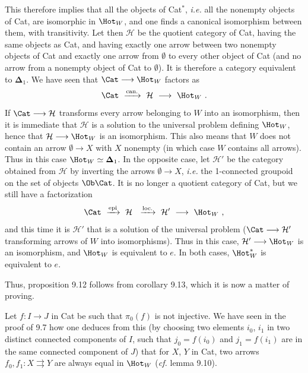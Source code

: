 This therefore implies that all the objects of Cat$^*$, \textit{i.e.} all the nonempty objects of Cat, are isomorphic in $\Hot_W$, and one finds a canonical isomorphism between them, with transitivity. Let then $\mathcal{H}$ be the quotient category of Cat, having the same objects as Cat, and having exactly one arrow between two nonempty objects of Cat and exactly one arrow from $\emptyset$ to every other object of Cat (and no arrow from a nonempty object of Cat to $\emptyset$). It is therefore a category equivalent to $\boldsymbol{\Delta}_1$. We have seen that $\Cat\longrightarrow\Hot_W$ factors as
\[
\Cat\ \xrightarrow{\text{can.}}\ \mathcal{H}\ \longrightarrow\ \Hot_W\ .
\]
If $\Cat\longrightarrow\mathcal{H}$ transforms every arrow belonging to $W$ into an isomorphism, then it is immediate that $\mathcal{H}$ is a solution to the universal problem defining $\Hot_W$, hence that $\mathcal{H}\longrightarrow\Hot_W$ is an isomorphism. This also means that $W$ does not contain an arrow $\emptyset\longrightarrow X$ with $X$ nonempty (in which case $W$ contains all arrows). Thus in this case $\Hot_W\simeq\boldsymbol{\Delta}_1$. In the opposite case, let $\mathcal{H}'$ be the category obtained from $\mathcal{H}$ by inverting the arrows $\emptyset\longrightarrow X$, \textit{i.e.} the 1-connected groupoid on the set of objects $\Ob\Cat$. It is no longer a quotient category of Cat, but we still have a factorization
\[
\Cat\ \xrightarrow{\text{epi}}\ \mathcal{H}\ \ \xrightarrow{\text{loc.}}\ \mathcal{H}'\ \longrightarrow\ \Hot_W\ ,
\]
and this time it is $\mathcal{H}'$ that is a solution of the universal problem ($\Cat\longrightarrow\mathcal{H}'$ transforming arrows of $W$ into isomorphisms). Thus in this case, $\mathcal{H}'\longrightarrow\Hot_W$ is an isomorphism, and $\Hot_W$ is equivalent to $e$. In both cases, $\Hot_W^*$ is equivalent to $e$.

Thus, proposition 9.12 follows from corollary 9.13, which it is now a matter of proving.

Let $f:I\longrightarrow J$ in Cat be such that $\pi_0(f)$ is not injective. We have seen in the proof of 9.7 how one deduces from this (by choosing two elements $i_0$, $i_1$ in two distinct connected components of $I$, such that $j_0=f(i_0)$ and $j_1=f(i_1)$ are in the same connected component of $J$) that for $X$, $Y$ in Cat, two arrows $f_0,f_1:X\rightrightarrows Y$ are always equal in $\Hot_W$ (\textit{cf.} lemma 9.10).

